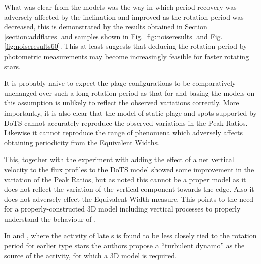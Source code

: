 What was clear from the models was the way in which period recovery was adversely affected by the inclination and
improved as the rotation period was decreased, this is demonstrated by the results obtained in Section
\ref{section:addflares} and samples shown in Fig. \ref{fig:noiseresults} and Fig. \ref{fig:noiseresults60}. This at
least suggests that deducing the rotation period by photometric measurements may become increasingly feasible for faster
rotating stars.

It is probably naive to expect the plage configurations to be comparatively unchanged over such a long rotation period
as that for {\prox} and basing the models on this assumption is unlikely to reflect the observed variations
correctly. More importantly, it is also clear that the model of static plage and spots supported by DoTS cannot
accurately reproduce the observed variations in the Peak Ratios. Likewise it cannot reproduce the range of phenomena which
adversely affects obtaining periodicity from the Equivalent Widths.

This, together with the experiment with adding the effect of a net vertical velocity to the flux profiles to the DoTS
model showed some improvement in the variation of the Peak Ratios, but as noted this cannot be a proper model as it does
not reflect the variation of the vertical component towards the edge. Also it does not adversely effect the Equivalent
Width measure. This points to the need for a properly-constructed 3D model including vertical processes to properly
understand the behaviour of \prox.

In \citet{mohanty02} and \citet{mohanty03}, where the activity of late \rdwarf s is found to be less closely tied to the
rotation period for earlier type stars the authors propose a ``turbulent dynamo'' as the source of the activity, for
which a 3D model is required.


